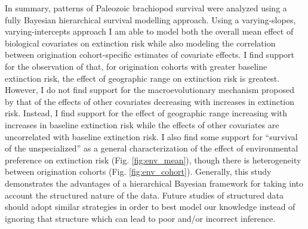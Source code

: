 \documentclass[12pt,letterpaper]{article}
\begin{document}
In summary, patterns of Paleozoic brachiopod survival were analyzed using a fully Bayesian hierarchical survival modelling approach. Using a varying-slopes, varying-intercepts approach I am able to model both the overall mean effect of biological covariates on extinction risk while also modeling the correlation between origination cohort-specific estimates of covariate effects. I find support for the observation of \citet{Jablonski1986} that, for origination cohorts with greater baseline extinction risk, the effect of geographic range on extinction risk is greatest. However, I do not find support for the macroevolutionary mechanism proposed by \citet{Jablonski1986} that of the effects of other covariates decreasing with increases in extinction risk. Instead, I find support for the effect of geographic range increasing with increases in baseline extinction risk while the effects of other covariates are uncorrelated with baseline extinction risk. I also find some support for ``survival of the unspecialized'' \citet{Simpson1944,Liow2004a,Liow2007b,Nurnberg2013a,Nurnberg2015} as a general characterization of the effect of environmental preference on extinction risk (Fig. \ref{fig:env_mean}), though there is heterogeneity between origination cohorts (Fig. \ref{fig:env_cohort}). Generally, this study demonstrates the advantages of a hierarchical Bayesian framework for taking into account the structured nature of the data. Future studies of structured data should adopt similar strategies in order to best model our knowledge instead of ignoring that structure which can lead to poor and/or incorrect inference.
\end{document}
